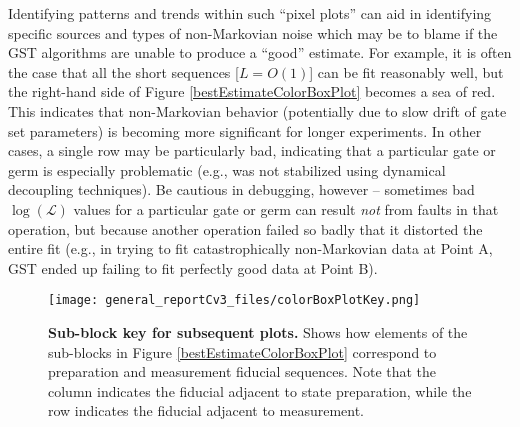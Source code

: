 \documentclass{article}[11pt]
\begin{document}
{Identifying patterns and trends within such ``pixel plots'' can aid in identifying specific sources and types of non-Markovian noise which may be to blame if the GST algorithms are unable to produce a ``good'' estimate.  For example, it is often the case that all the short sequences [$L = O(1)$] can be fit reasonably well, but the right-hand side of Figure \ref{bestEstimateColorBoxPlot} becomes a sea of red.  This indicates that non-Markovian behavior (potentially due to slow drift of gate set parameters) is becoming more significant for longer experiments.  In other cases, a single row may be particularly bad, indicating that a particular gate or germ is especially problematic (e.g., was not stabilized using dynamical decoupling techniques).  Be cautious in debugging, however -- sometimes bad $\log(\mathcal{L})$ values for a particular gate or germ can result \emph{not} from faults in that operation, but because another operation failed so badly that it distorted the entire fit (e.g., in trying to fit catastrophically non-Markovian data at Point A, GST ended up failing to fit perfectly good data at Point B).




\begin{figure}
\begin{center}
\texttt{[image: general\_reportCv3\_files/colorBoxPlotKey.png]}
\caption{\textbf{Sub-block key for subsequent plots.} Shows how elements of the sub-blocks in Figure \ref{bestEstimateColorBoxPlot} correspond to preparation and measurement fiducial sequences.  Note that the column indicates the fiducial adjacent to state preparation, while the row indicates the fiducial adjacent to measurement.\label{colorBoxPlotKeyPlot}}
\end{center}
\end{figure}


}
\end{document}
